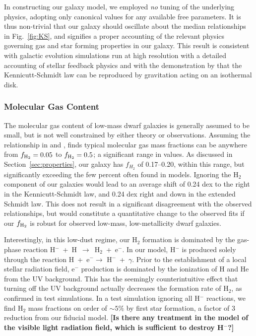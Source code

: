 \documentclass[twocolumn]{aastex61}
\begin{document}
In constructing our galaxy model, we employed \textit{no} tuning of the underlying physics, adopting only canonical values for any available free parameters. It is thus non-trivial that our galaxy should oscillate about the median relationships in Fig.~\ref{fig:KS}, and signifies a proper accounting of the relevant physics governing gas and star forming properties in our galaxy. This result is consistent with galactic evolution simulations run at high resolution with a detailed accounting of stellar feedback physics \citep[see ][ and references therein]{NaabOstriker2017} and with the demonstration by \citet{Li2005} that the Kennicutt-Schmidt law can be reproduced by gravitation acting on an isothermal disk. 

\subsubsection{Molecular Gas Content}
\label{sec:molecular gas content}

The molecular gas content of low-mass dwarf galaxies is generally assumed
to be small, but is not well constrained by either theory or observations. Assuming the relationship in \citet{Leroy2013} and \citet{Momose2013}, \citet{Roychowdhury2014} finds typical molecular gas mass fractions can be anywhere from $f_{\rm H_2} = 0.05$ to $f_{\rm H_2} = 0.5$; a significant range in values. As discussed in Section~\ref{sec:properties}, our galaxy has $f_{H_2}$ of 0.17--0.20, within this range, but significantly exceeding the few percent often found in models. Ignoring the H$_2$ component of our galaxies would lead to an average shift of 0.24 dex to the right in the Kennicutt-Schmidt law, and 0.24 dex right and down in the extended Schmidt law. This does not result in a significant disagreement with the observed relationships, but would constitute a quantitative change to the observed fits if our $f_{\rm H_2}$ is robust for observed low-mass, low-metallicity dwarf galaxies. 

Interestingly, in this low-dust regime, our H$_2$ formation is dominated by the gas-phase reaction H$^-$~+~H~$\rightarrow$~H$_2$~+~e$^{-}$. In our model, H$^{-}$ is produced solely through the reaction H~+~e$^{-} \rightarrow$ H$^{-}$~+~$\gamma$. Prior to the establishment of a local stellar radiation field, e$^{-}$ production is dominated by the ionization of H and He from the UV background. This has the seemingly counterintuitive effect that turning off the UV background actually decreases the formation rate of H$_2$, as confirmed in test simulations. In a test simulation ignoring all H$^{-}$ reactions, we find H$_{2}$ mass fractions on order of  $\sim 5\%$ by first star formation, a factor of 3 reduction from our fiducial model.
    {\bf [Is there any treatment in the model of the visible light radiation field, which is sufficient to destroy H$^-$?]}
    
\end{document}
